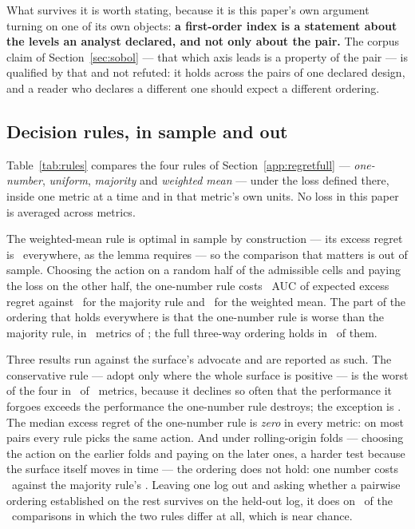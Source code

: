 What survives it is worth stating, because it is this paper's own argument
turning on one of its own objects: \textbf{a first-order index is a statement
about the levels an analyst declared, and not only about the pair.} The corpus
claim of Section~\ref{sec:sobol} --- that which axis leads is a property of
the pair --- is qualified by that and not refuted: it holds across the pairs
of one declared design, and a reader who declares a different one should
expect a different ordering.

\subsection{Decision rules, in sample and out}
\label{app:rulesfull}
\label{sec:rules}

Table~\ref{tab:rules} compares the four rules of
Section~\ref{app:regretfull} --- \emph{one-number}, \emph{uniform},
\emph{majority} and \emph{weighted mean} --- under the loss defined there,
inside one metric at a time and in that metric's own units. No loss in
this paper is averaged across metrics.

The weighted-mean rule is optimal in sample by construction --- its excess
regret is \identityMaxExcess\ everywhere, as the lemma requires --- so the
comparison that matters is out of sample. Choosing the action on a random half
of the admissible cells and paying the loss on the other half, the one-number
rule costs \oosOneNumberAuc\ AUC of expected excess regret against
\oosMajorityAuc\ for the majority rule and \oosMeanAuc\ for the weighted mean.
The part of the ordering that holds everywhere is that the one-number rule is
worse than the majority rule, in \nInstrumentsOneNumberWorse\ metrics of
\nInstruments; the full three-way ordering holds in
\nInstrumentsOosOrdering\ of them.

Three results run against the surface's advocate and are reported as such. The
conservative rule --- adopt only where the whole surface is positive --- is
the worst of the four in \nInstrumentsUniformWorst\ of \nInstruments\
metrics, because it declines so often that the performance it forgoes
exceeds the performance the one-number rule destroys; the exception is
\instrumentsUniformNotWorst. The median excess regret of the one-number rule
is \emph{zero} in every metric: on most pairs every rule picks the same
action. And under rolling-origin folds --- choosing the action on the earlier
folds and paying on the later ones, a harder test because the surface itself
moves in time --- the ordering does not hold: one number costs \oostOneNumber\
against the majority rule's \oostMajority. Leaving one log out and asking
whether a pairwise ordering established on the rest survives on the held-out
log, it does on \leaveOneOutAgreePct\ of the \nLeaveOneOut\ comparisons in
which the two rules differ at all, which is near chance.


